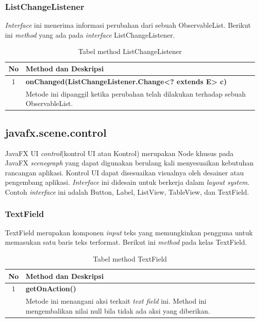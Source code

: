 \subsubsection{ListChangeListener}
\textit{Interface} ini menerima informasi perubahan dari sebuah ObservableList. Berikut ini \textit{method} yang ada pada \textit{interface} ListChangeListener.\cite{javafx3}
\begin{table}[H]
		\centering
		\caption{Tabel method ListChangeListener}
		\label{tab:method_ListChangeListener}
	\begin{tabular}{|c|p{12cm}|}
		\hline
		\textbf{No} & \textbf{Method dan Deskripsi} \\ \hline \hline
		1 & \textbf{onChanged(ListChangeListener.Change<? extends E> c)}\\
			&	Metode ini dipanggil ketika perubahan telah dilakukan terhadap sebuah ObservableList.\\ \hline
	\end{tabular}
\end{table}

\subsection{javafx.scene.control}
JavaFX UI \textit{control}(kontrol UI atau Kontrol) merupakan Node khusus pada JavaFX \textit{scenegraph} yang dapat digunakan berulang kali menyesuaikan kebutuhan rancangan aplikasi. Kontrol UI dapat disesuaikan visualnya oleh desainer atau pengembang aplikasi. \textit{Interface} ini didesain untuk berkerja dalam \textit{layout system}. Contoh \textit{interface} ini adalah Button, Label, ListView, TableView, dan TextField.\cite{javafx3}

\subsubsection{TextField}
TextField merupakan komponen \textit{input} teks yang memungkinkan pengguna untuk memasukan satu baris teks terformat. Berikut ini \textit{method} pada kelas TextField.\cite{javafx3}
\begin{table}[H]
		\centering
		\caption{Tabel method TextField}
		\label{tab:method_textField}
	\begin{tabular}{|c|p{12cm}|}
		\hline
		\textbf{No} & \textbf{Method dan Deskripsi} \\ \hline \hline
		1 & \textbf{getOnAction()}\\
			&	Metode ini menangani aksi terkait \textit{text field} ini. Method ini mengembalikan nilai null bila tidak ada aksi yang diberikan.\\ \hline
	\end{tabular}
\end{table}

